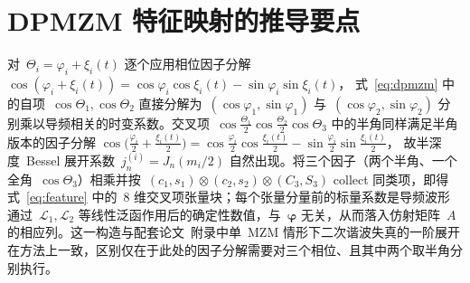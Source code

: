 \documentclass[11pt,journal,onecolumn]{IEEEtran}
\theoremstyle{plain}
\theoremstyle{remark}
\newcommand{\phiv}{\bm{\varphi}}
\newcommand{\Lc}{\mathcal{L}}
\begin{document}
\appendices
\section{DPMZM 特征映射的推导要点}
\label{app:feature}
对~$\Theta_i=\varphi_i+\xi_i(t)$ 逐个应用相位因子分解
$\cos(\varphi_i+\xi_i(t))=\cos\varphi_i\cos\xi_i(t)-\sin\varphi_i\sin\xi_i(t)$，
式~\eqref{eq:dpmzm} 中的自项~$\cos\Theta_1,\cos\Theta_2$ 直接分解为~$(\cos\varphi_1,\sin\varphi_1)$ 与~$(\cos\varphi_2,\sin\varphi_2)$ 分别乘以导频相关的时变系数。交叉项~$\cos\frac{\Theta_1}{2}\cos\frac{\Theta_2}{2}\cos\Theta_3$ 中的半角同样满足半角版本的因子分解
$\cos\bigl(\tfrac{\varphi_i}{2}+\tfrac{\xi_i(t)}{2}\bigr)
=\cos\tfrac{\varphi_i}{2}\cos\tfrac{\xi_i(t)}{2}-\sin\tfrac{\varphi_i}{2}\sin\tfrac{\xi_i(t)}{2}$，
故半深度~Bessel 展开系数~$j_n^{(i)}=J_n(m_i/2)$ 自然出现。将三个因子（两个半角、一个全角~$\cos\Theta_3$）相乘并按~$(c_1,s_1)\otimes(c_2,s_2)\otimes(C_3,S_3)$ collect 同类项，即得式~\eqref{eq:feature} 中的~8 维交叉项张量块；每个张量分量前的标量系数是导频波形通过~$\Lc_1,\Lc_2$ 等线性泛函作用后的确定性数值，与~$\phiv$ 无关，从而落入仿射矩阵~$A$ 的相应列。这一构造与配套论文~\cite{mzmaffine}附录中单~MZM 情形下二次谐波失真的一阶展开在方法上一致，区别仅在于此处的因子分解需要对三个相位、且其中两个取半角分别执行。
\end{document}
